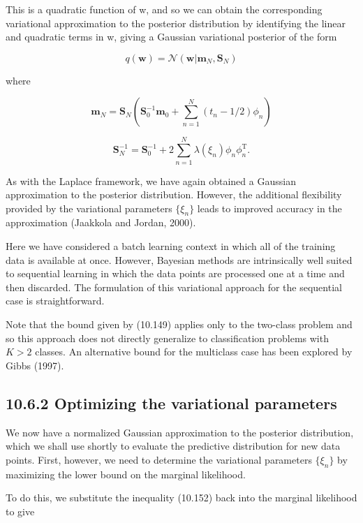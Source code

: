 \documentclass[
  10
]{article}
\begin{document}
This is a quadratic function of w, and so we can obtain the
corresponding variational approximation to the posterior distribution by
identifying the linear and quadratic terms in w, giving a Gaussian
variational posterior of the form

\[
q (\mathbf {w}) = \mathcal {N} (\mathbf {w} | \mathbf {m} _ {N}, \mathbf {S} _ {N})\tag{10.156}
\]

where

\[
\mathbf {m} _ {N} = \mathbf {S} _ {N} \left(\mathbf {S} _ {0} ^ {- 1} \mathbf {m} _ {0} + \sum_ {n = 1} ^ {N} (t _ {n} - 1 / 2) \phi_ {n}\right)\tag{10.157}
\]

\[
\mathbf {S} _ {N} ^ {- 1} = \mathbf {S} _ {0} ^ {- 1} + 2 \sum_ {n = 1} ^ {N} \lambda (\xi_ {n}) \phi_ {n} \phi_ {n} ^ {\mathrm{T}}.\tag{10.158}
\]

As with the Laplace framework, we have again obtained a Gaussian
approximation to the posterior distribution. However, the additional
flexibility provided by the variational parameters \(\{ \xi _ { n } \}\)
leads to improved accuracy in the approximation (Jaakkola and Jordan,
2000).

Here we have considered a batch learning context in which all of the
training data is available at once. However, Bayesian methods are
intrinsically well suited to sequential learning in which the data
points are processed one at a time and then discarded. The formulation
of this variational approach for the sequential case is straightforward.

Note that the bound given by (10.149) applies only to the two-class
problem and so this approach does not directly generalize to
classification problems with \(K > 2\) classes. An alternative bound for
the multiclass case has been explored by Gibbs (1997).

\subsection{10.6.2 Optimizing the variational
parameters}\label{optimizing-the-variational-parameters}

We now have a normalized Gaussian approximation to the posterior
distribution, which we shall use shortly to evaluate the predictive
distribution for new data points. First, however, we need to determine
the variational parameters \(\{ \xi _ { n } \}\) by maximizing the lower
bound on the marginal likelihood.

To do this, we substitute the inequality (10.152) back into the marginal
likelihood to give
\end{document}
